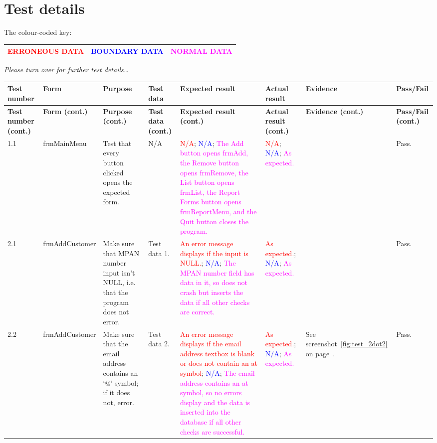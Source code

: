 \section{Test details}

The colour-coded key:
\begin{longtable}{ | p{4cm} | p{4cm} | p{4cm} | }
	\hline
	\textbf{\textcolor{red}{ERRONEOUS DATA}} & \textbf{\textcolor{blue}{BOUNDARY DATA}} & \textbf{\textcolor{magenta}{NORMAL DATA}}\\
	\hline
\end{longtable}

\textsl{Please turn over for further test details\ldots}
\begin{landscape}
\begin{longtable}{ | p{1cm} | p{2.5cm} | p{4cm} | p{1cm} | p{3cm} | p{3cm} | p{1.5cm} | p{1cm} |}
	\hline
	\textbf{Test number} & \textbf{Form} & \textbf{Purpose} & \textbf{Test data} & \textbf{Expected result} & \textbf{Actual result} & \textbf{Evidence} & \textbf{Pass\slash Fail}\\
	\endfirsthead
	\hline
	\textbf{Test number (cont.)} & \textbf{Form (cont.)} & \textbf{Purpose (cont.)} & \textbf{Test data (cont.)} & \textbf{Expected result (cont.)} & \textbf{Actual result (cont.)} & \textbf{Evidence (cont.)} & \textbf{Pass\slash Fail (cont.)}\\
	\endhead
	\hline
	1.1 & frmMainMenu & Test that every button clicked opens the expected form. & N\slash A & \textcolor{red}{N\slash A}; \textcolor{blue}{N\slash A}; \textcolor{magenta}{The Add button opens frmAdd, the Remove button opens frmRemove, the List button opens frmList, the Report Forms button opens frmReportMenu, and the Quit button closes the program.} & \textcolor{red}{N\slash A}; \textcolor{blue}{N\slash A}; \textcolor{magenta}{As expected.} & & Pass.\\
	\hline
	2.1 & frmAddCustomer & Make sure that MPAN number input isn't NULL, i.e. that the program does not error. & Test data 1. & \textcolor{red}{An error message displays if the input is NULL.}; \textcolor{blue}{N\slash A}; \textcolor{magenta}{The MPAN number field has data in it, so does not crash but inserts the data if all other checks are correct.} & \textcolor{red}{As expected.}; \textcolor{blue}{N\slash A}; \textcolor{magenta}{As expected.} &  & Pass.\\
	\hline
	2.2 & frmAddCustomer & Make sure that the email address contains an `@' symbol; if it does not, error. & Test data 2. & \textcolor{red}{An error message displays if the email address textbox is blank or does not contain an at symbol}; \textcolor{blue}{N\slash A}; \textcolor{magenta}{The email address contains an at symbol, so no errors display and the data is inserted into the database if all other checks are successful.} & \textcolor{red}{As expected.}; \textcolor{blue}{N\slash A}; \textcolor{magenta}{As expected.} & See screenshot~\ref{fig:test_2dot2} on page~\pageref{fig:test_2dot2}. & Pass.\\

\end{longtable}
\end{landscape}
